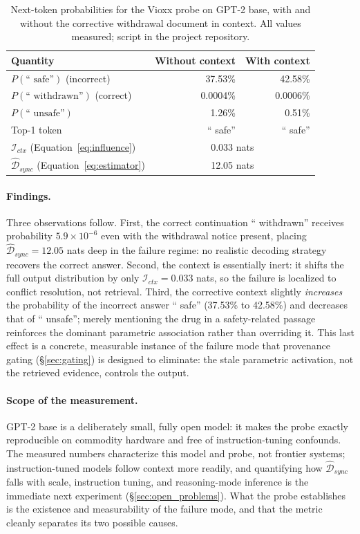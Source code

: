 \documentclass{article}
\begin{document}
\begin{table}[h]
\centering
\caption{Next-token probabilities for the Vioxx probe on GPT-2 base, with and without the corrective withdrawal document in context. All values measured; script in the project repository.}
\label{tab:vioxx_results}
\small
\begin{tabular}{@{}lrr@{}}
\toprule
\textbf{Quantity} & \textbf{Without context} & \textbf{With context} \\
\midrule
$P(\text{`` safe''})$ (incorrect) & 37.53\% & 42.58\% \\
$P(\text{`` withdrawn''})$ (correct) & 0.0004\% & 0.0006\% \\
$P(\text{`` unsafe''})$ & 1.26\% & 0.51\% \\
Top-1 token & `` safe'' & `` safe'' \\
\midrule
$\mathcal{I}_{ctx}$ (Equation~\ref{eq:influence}) & \multicolumn{2}{c}{0.033 nats} \\
$\widehat{\mathcal{D}}_{sync}$ (Equation~\ref{eq:estimator}) & \multicolumn{2}{c}{12.05 nats} \\
\bottomrule
\end{tabular}
\end{table}

\paragraph{Findings.} Three observations follow. First, the correct continuation `` withdrawn'' receives probability $5.9 \times 10^{-6}$ even with the withdrawal notice present, placing $\widehat{\mathcal{D}}_{sync} = 12.05$ nats deep in the failure regime: no realistic decoding strategy recovers the correct answer. Second, the context is essentially inert: it shifts the full output distribution by only $\mathcal{I}_{ctx} = 0.033$ nats, so the failure is localized to conflict resolution, not retrieval. Third, the corrective context slightly \textit{increases} the probability of the incorrect answer `` safe'' (37.53\% to 42.58\%) and decreases that of `` unsafe''; merely mentioning the drug in a safety-related passage reinforces the dominant parametric association rather than overriding it. This last effect is a concrete, measurable instance of the failure mode that provenance gating (\S\ref{sec:gating}) is designed to eliminate: the stale parametric activation, not the retrieved evidence, controls the output.

\paragraph{Scope of the measurement.} GPT-2 base is a deliberately small, fully open model: it makes the probe exactly reproducible on commodity hardware and free of instruction-tuning confounds. The measured numbers characterize this model and probe, not frontier systems; instruction-tuned models follow context more readily, and quantifying how $\widehat{\mathcal{D}}_{sync}$ falls with scale, instruction tuning, and reasoning-mode inference is the immediate next experiment (\S\ref{sec:open_problems}). What the probe establishes is the existence and measurability of the failure mode, and that the metric cleanly separates its two possible causes.
\end{document}
